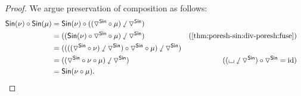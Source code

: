 \documentclass[a4paper]{memoir}
\begin{document}
{\begin{proof}
	We argue preservation of composition as follows:
	\begin{align*}
		\Sin(\nu) \circ \Sin(\mu)
		&= \Sin(\nu) \circ ((\cohcodisc^\Sin \circ \mu) \divleft \cohcodisc^\Sin) \\
		&= ((\Sin(\nu) \circ \cohcodisc^\Sin \circ \mu) \divleft \cohcodisc^\Sin)
		& \text{(\cref{thm:poresh-sin:div-poresh:fuse})} \\
		&= ((((\cohcodisc^\Sin \circ \nu) \divleft \cohcodisc^\Sin) \circ \cohcodisc^\Sin \circ \mu) \divleft \cohcodisc^\Sin) \\
		&= ((\cohcodisc^\Sin \circ \nu \circ \mu) \divleft \cohcodisc^\Sin)
		& ((\loch \divleft \cohcodisc^\Sin) \circ \cohcodisc^\Sin = \id) \\
		&= \Sin(\nu \circ \mu). &&& \qedhere
	\end{align*}
%	
%	
%	

\end{proof}}
\end{document}
